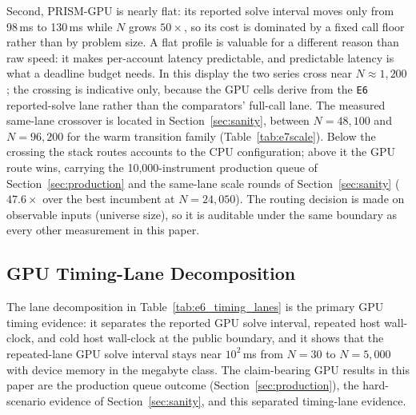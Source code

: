 \documentclass[10pt,a4paper]{extarticle}
\begin{document}
Second, PRISM-GPU is nearly flat: its reported solve interval moves only from
98\,ms to 130\,ms while $N$ grows $50\times$, so its cost is dominated by a
fixed call floor rather than by problem size. A flat profile is valuable for a
different reason than raw speed: it makes per-account latency predictable, and
predictable latency is what a deadline budget needs. In this display the two series cross near $N{\approx}1{,}200$; the
crossing is indicative only, because the GPU cells derive from the
\texttt{E6} reported-solve lane rather than the comparators' full-call lane.
The measured same-lane crossover is located in Section~\ref{sec:sanity},
between $N{=}48{,}100$ and $N{=}96{,}200$ for the warm transition family
(Table~\ref{tab:e7scale}). Below the crossing the stack routes accounts to the
CPU configuration; above it the GPU route wins, carrying the
10,000-instrument production queue of Section~\ref{sec:production} and the
same-lane scale rounds of Section~\ref{sec:sanity} ($47.6\times$ over the
best incumbent at $N{=}24{,}050$). The
routing decision is made on observable inputs (universe size), so it is
auditable under the same boundary as every other measurement in this paper.

\subsection{GPU Timing-Lane Decomposition}

The lane decomposition in Table~\ref{tab:e6_timing_lanes} is the primary GPU
timing evidence: it separates the reported GPU solve interval, repeated host
wall-clock, and cold host wall-clock at the public boundary, and it shows that
the repeated-lane GPU solve interval stays near $10^{2}$\,ms from $N{=}30$ to
$N{=}5{,}000$ with device memory in the megabyte class. The claim-bearing GPU
results in this paper are the production queue outcome
(Section~\ref{sec:production}), the hard-scenario evidence of
Section~\ref{sec:sanity}, and this separated timing-lane evidence.
\end{document}
